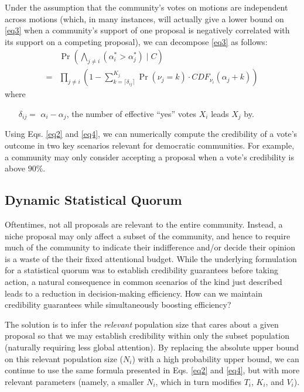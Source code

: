 \documentclass[chi_draft]{sigchi}
\begin{document}
Under the assumption that the community's votes on motions are independent across motions (which, in many instances, will actually give a lower bound on \eqref{eq3} when a community's support of one proposal is negatively correlated with its support on a competing proposal), we can decompose \eqref{eq3} as follows:
\begin{align}\label{eq5}
& \Pr\left(\bigwedge_{j \neq i} (\alpha^*_i > \alpha^*_j) \mid C\right) \nonumber \\
= & \prod_{j \neq i}\left(1 - \sum_{k=\lceil\delta_{ij}\rceil}^{K_j} \Pr(\nu_j = k) \cdot {CDF}_{\nu_i}(\alpha_j + k) \right)
\end{align}
where
\begin{description}
\begin{itemize}
\item[$\delta_{ij} = $] $\alpha_i - \alpha_j$, the number of effective ``yes'' votes $X_i$ leads $X_j$ by.
\end{itemize}
\end{description}

Using Eqs. \eqref{eq2} and \eqref{eq4}, we can numerically compute the credibility of a vote's outcome in two key scenarios relevant for democratic communities.  For example, a community may only consider accepting a proposal when a vote's credibility is above $90\%$.

\subsection{Dynamic Statistical Quorum}
Oftentimes, not all proposals are relevant to the entire community.  Instead, a niche proposal may only affect a subset of the community, and hence to require much of the community to indicate their indifference and/or decide their opinion is a waste of the their fixed attentional budget.  While the underlying formulation for a statistical quorum was to establish credibility guarantees before taking action, a natural consequence in common scenarios of the kind just described leads to a reduction in decision-making efficiency.  How can we maintain credibility guarantees while simultaneously boosting efficiency?

The solution is to infer the \textit{relevant} population size that cares about a given proposal so that we may establish credibility within only the subset population (naturally requiring less global attention).  By replacing the absolute upper bound on this relevant population size ($N_i$) with a high probability upper bound, we can continue to use the same formula presented in Eqs. \eqref{eq2} and \eqref{eq4}, but with more relevant parameters (namely, a smaller $N_i$, which in turn modifies $T_i$, $K_i$, and $V_i$).
\end{document}
